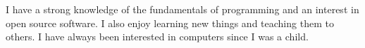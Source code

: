 

\begin{cvparagraph}

I have a strong knowledge of the fundamentals of programming and an interest in open source software. 
I also enjoy learning new things and teaching them to others. 
I have always been interested in computers since I was a child.

\end{cvparagraph}
